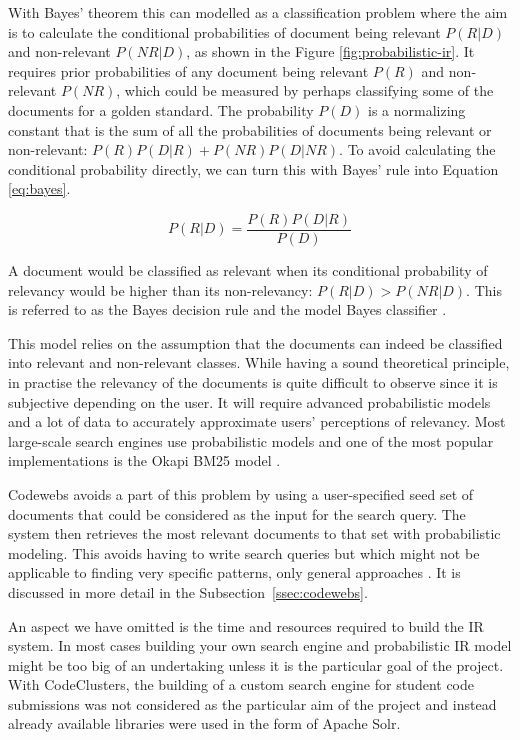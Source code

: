 With Bayes' theorem this can modelled as a classification problem where the aim is to calculate the conditional probabilities of document being relevant $P(R|D)$ and non-relevant $P(NR|D)$, as shown in the Figure \ref{fig:probabilistic-ir}. It requires prior probabilities of any document being relevant $P(R)$ and non-relevant $P(NR)$, which could be measured by perhaps classifying some of the documents for a golden standard. The probability $P(D)$ is a normalizing constant that is the sum of all the probabilities of documents being relevant or non-relevant: $P(R)P(D|R) + P(NR)P(D|NR)$. To avoid calculating the conditional probability directly, we can turn this with Bayes' rule into Equation \ref{eq:bayes}.

\begin{equation}
\label{eq:bayes}
P(R|D)=\frac{P(R)P(D|R)}{P(D)}
\end{equation}
\vspace{-2pt}

A document would be classified as relevant when its conditional probability of relevancy would be higher than its non-relevancy: $P(R|D) > P(NR|D)$. This is referred to as the Bayes decision rule and the model Bayes classifier \cite{ir-in-practise}.

This model relies on the assumption that the documents can indeed be classified into relevant and non-relevant classes. While having a sound theoretical principle, in practise the relevancy of the documents is quite difficult to observe since it is subjective depending on the user. It will require advanced probabilistic models and a lot of data to accurately approximate users' perceptions of relevancy. Most large-scale search engines use probabilistic models and one of the most popular implementations is the Okapi BM25 model \cite{ir-in-practise}.

Codewebs avoids a part of this problem by using a user-specified seed set of documents that could be considered as the input for the search query. The system then retrieves the most relevant documents to that set with probabilistic modeling. This avoids having to write search queries but which might not be applicable to finding very specific patterns, only general approaches \cite{codewebs}. It is discussed in more detail in the Subsection~\ref{ssec:codewebs}.

An aspect we have omitted is the time and resources required to build the IR system. In most cases building your own search engine and probabilistic IR model might be too big of an undertaking unless it is the particular goal of the project. With CodeClusters, the building of a custom search engine for student code submissions was not considered as the particular aim of the project and instead already available libraries were used in the form of Apache Solr. 

